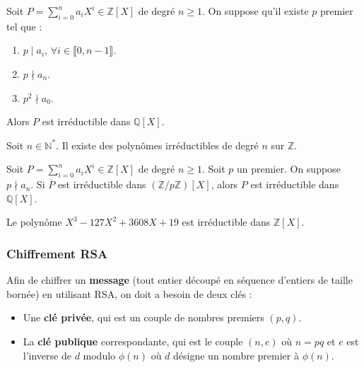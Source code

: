   \begin{theorem}
    Soit $P = \sum_{i=0}^n a_i X^i \in \mathbb{Z}[X]$ de degré $n \geq 1$. On suppose qu'il existe $p$ premier tel que :
    \begin{enumerate}[label=(\roman*)]
      \item $p \mid a_i$, $\forall i \in \llbracket 0, n-1 \rrbracket$.
      \item $p \nmid a_n$.
      \item $p^2 \nmid a_0$.
    \end{enumerate}
    Alors $P$ est irréductible dans $\mathbb{Q}[X]$.
  \end{theorem}


  \begin{application}
    Soit $n \in \mathbb{N}^*$. Il existe des polynômes irréductibles de degré $n$ sur $\mathbb{Z}$.
  \end{application}


  \begin{theorem}
    Soit $P = \sum_{i=0}^n a_i X^i \in \mathbb{Z}[X]$ de degré $n \geq 1$. Soit $p$ un premier. On suppose $p \nmid a_n$.
    \newpar
    Si $\overline{P}$ est irréductible dans $(\mathbb{Z}/p\mathbb{Z})[X]$, alors $P$ est irréductible dans $\mathbb{Q}[X]$.
  \end{theorem}

  \begin{example}
    Le polynôme $X^3-127X^2+3608X+19$ est irréductible dans $\mathbb{Z}[X]$.
  \end{example}

  \subsubsection{Chiffrement RSA}


  \begin{definition}
    Afin de chiffrer un \textbf{message} (tout entier découpé en séquence d'entiers de taille bornée) en utilisant RSA, on doit a besoin de deux clés :
    \begin{itemize}
      \item Une \textbf{clé privée}, qui est un couple de nombres premiers $(p,q)$.
      \item La \textbf{clé publique} correspondante, qui est le couple $(n,e)$ où $n = pq$ et $e$ est l'inverse de $d$ modulo $\phi(n)$ où $d$ désigne un nombre premier à $\phi(n)$.
    \end{itemize}
  \end{definition}

